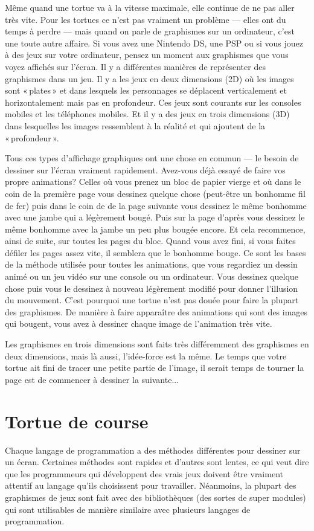 Même quand une tortue va à la vitesse maximale, elle continue de ne pas aller très vite. Pour les tortues ce n'est pas vraiment un problème --- elles ont du temps à perdre --- mais quand on parle de graphismes sur un ordinateur, c'est une toute autre affaire. Si vous avez une Nintendo DS, une PSP ou si vous jouez à des jeux sur votre ordinateur, pensez un moment aux graphismes que vous voyez affichés sur l'écran. Il y a différentes manières de représenter des graphismes dans un jeu. Il y a les jeux en deux dimensions (2D) où les images sont « plates » et dans lesquels les personnages se déplacent verticalement et horizontalement mais pas en profondeur.
Ces jeux sont courants sur les consoles mobiles et les téléphones mobiles. Et il y a des jeux en trois dimensions (3D) dans lesquelles les images ressemblent à la réalité et qui ajoutent de la « profondeur ».

Tous ces types d'affichage graphiques ont une chose en commun --- le besoin de dessiner sur l'écran vraiment rapidement. Avez-vous déjà essayé de faire vos propre animations? Celles où vous prenez un bloc de papier vierge et où dans le coin de la première page vous dessinez quelque chose (peut-être un bonhomme fil de fer) puis dans le coin de de la page suivante vous dessinez le même bonhomme avec une jambe qui a légèrement bougé. Puis sur la page d'après vous dessinez le même bonhomme avec la jambe un peu plus bougée encore. Et cela recommence, ainsi de suite, sur toutes les pages du bloc. Quand vous avez fini, si vous faites défiler les pages assez vite, il semblera que le bonhomme bouge. Ce sont les bases de la méthode utilisée pour toutes les animations, que vous regardiez un dessin animé ou un jeu vidéo sur une console ou un ordinateur. Vous dessinez quelque chose puis vous le dessinez à nouveau légèrement modifié pour donner l'illusion du mouvement. C'est pourquoi une tortue n'est pas douée pour faire la plupart des graphismes. De manière à faire apparaître des animations qui sont des images qui bougent, vous avez à dessiner chaque image de l'animation très vite.

Les graphismes en trois dimensions sont faits très différemment des graphismes en deux dimensions, mais là aussi, l'idée-force est la même. Le temps que votre tortue ait fini de tracer une petite partie de l'image, il serait temps de tourner la page est de commencer à dessiner la suivante...



\section{Tortue de course}
Chaque langage de programmation a des méthodes différentes pour dessiner sur un écran. Certaines méthodes sont rapides et d'autres sont lentes, ce qui veut dire que les programmeurs qui développent des vrais jeux 
doivent être vraiment attentif au langage qu'ils choisissent pour travailler. Néanmoins, la plupart des graphismes de jeux sont fait avec des bibliothèques (des sortes de super modules) qui sont utilisables de manière similaire avec plusieurs langages de programmation.

